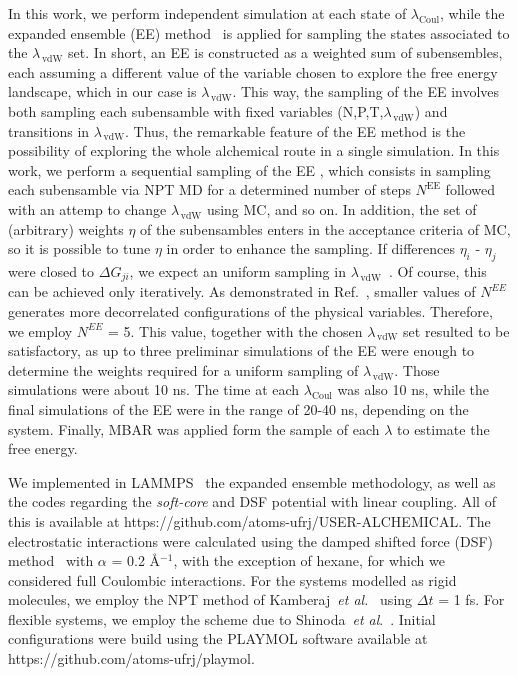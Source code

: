 \documentclass[3p,twocolumn]{elsarticle}
\begin{document}
In this work, we perform independent simulation at each state of $\lambda_{\text{Coul}}$, while the expanded ensemble (EE) method~\cite{Lyubartsev_1992} is applied for sampling the states associated to the $\lambda_{\,\text{vdW}}$ set. In short, an EE is constructed as a weighted sum of subensembles, each assuming a different value of the variable chosen to explore the free energy landscape, which in our case is $\lambda_{\,\text{vdW}}$. This way, the sampling of the EE involves both sampling each subensamble with fixed variables (N,P,T,$\lambda_{\,\text{vdW}}$) and transitions in $\lambda_{\,\text{vdW}}$. Thus, the remarkable feature of the EE method is the possibility of exploring the whole alchemical route in a single simulation. In this work, we perform a sequential sampling of the EE \cite{Chodera_2011_2}, which consists in sampling each subensamble via NPT MD for a determined number of steps $N^{\text{EE}}$ followed with an attemp to change $\lambda_{\,\text{vdW}}$ using MC, and so on. In addition, the set of (arbitrary) weights $\eta$ of the subensambles enters in the acceptance criteria of MC, so it is possible to tune $\eta$ in order to enhance the sampling. If differences $\eta_i$ - $\eta_j$ were closed to $\Delta G_{ji}$, we expect an uniform sampling in $\lambda_{\,\text{vdW}}$~\cite{Lyubartsev_1992}. Of course, this can be achieved only iteratively. As demonstrated in Ref.~, smaller values of $N^{EE}$ generates more decorrelated configurations of the physical variables. Therefore, we employ $N^{EE}$ = 5. This value, together with the chosen $\lambda_{\, \text{vdW}}$ set resulted to be satisfactory, as up to three preliminar simulations of the EE were enough to determine the weights required for a uniform sampling of $\lambda_{\, \text{vdW}}$. Those simulations were about 10 ns. The time at each $\lambda_{\text{Coul}}$ was also 10 ns, while the final simulations of the EE were in the range of 20-40 ns, depending on the system. Finally, MBAR \cite{Shirts_2008} was applied form the sample of each $\lambda$ to estimate the free energy.

We implemented in LAMMPS~\cite{Plimpton1995} the expanded ensemble methodology, as well as the codes regarding the \textit{soft-core} and DSF potential with linear coupling. All of this is available at https://github.com/atoms-ufrj/USER-ALCHEMICAL. The electrostatic interactions were calculated using the damped shifted force (DSF) method~\cite{Fennell2006} with $\alpha$ = 0.2 {\AA}$^{-1}$, with the exception of hexane, for which we considered full Coulombic interactions. For the systems modelled as rigid molecules, we employ the NPT method of Kamberaj~\textit{et al.}~\cite{Kamberaj_2005} using $\Delta t$ = 1 fs. For flexible systems, we employ the scheme due to Shinoda~\textit{et al}.~\cite{Shinoda2004}. Initial configurations were build using the PLAYMOL software available at https://github.com/atoms-ufrj/playmol.
\end{document}
